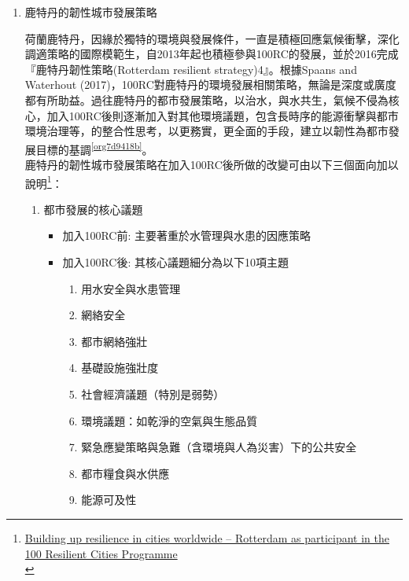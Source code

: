 \documentclass[a4paper,12pt]{article}
\begin{document}
\begin{enumerate}
\begin{enumerate}
\item 鹿特丹的韌性城市發展策略
\label{sec:org9b491e0}

荷蘭鹿特丹，因緣於獨特的環境與發展條件，一直是積極回應氣候衝擊，深化調適策略的國際模範生，自2013年起也積極參與100RC的發展，並於2016完成『鹿特丹韌性策略(Rotterdam resilient strategy)4』。根據Spaans and Waterhout (2017)，100RC對鹿特丹的環境發展相關策略，無論是深度或廣度都有所助益。過往鹿特丹的都市發展策略，以治水，與水共生，氣候不侵為核心，加入100RC後則逐漸加入對其他環境議題，包含長時序的能源衝擊與都市環境治理等，的整合性思考，以更務實，更全面的手段，建立以韌性為都市發展目標的基調\textsuperscript{\ref{org7d9418b}}。\\

鹿特丹的韌性城市發展策略在加入100RC後所做的改變可由以下三個面向加以說明\footnote{\href{https://www.sciencedirect.com/science/article/abs/pii/S0264275116301159}{Building up resilience in cities worldwide – Rotterdam as participant in the 100 Resilient Cities Programme}\\}：\\
\begin{enumerate}
\item 都市發展的核心議題\\
\begin{itemize}
\item 加入100RC前: 主要著重於水管理與水患的因應策略\\
\item 加入100RC後: 其核心議題細分為以下10項主題\\
\begin{enumerate}
\item 用水安全與水患管理\\
\item 網絡安全\\
\item 都市網絡強壯\\
\item 基礎設施強壯度\\
\item 社會經濟議題（特別是弱勢）\\
\item 環境議題：如乾淨的空氣與生態品質\\
\item 緊急應變策略與急難（含環境與人為災害）下的公共安全\\
\item 都市糧食與水供應\\
\item 能源可及性\\

\end{enumerate}
\end{itemize}
\end{enumerate}
\end{enumerate}
\end{enumerate}
\end{document}
